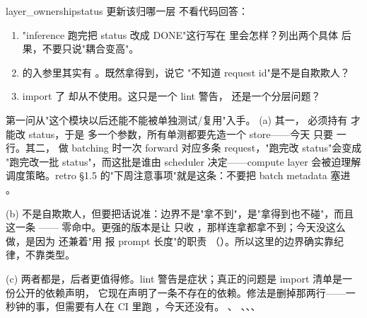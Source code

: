 \begin{checkpoint}{layer_ownership}{status 更新该归哪一层}
不看代码回答：
\begin{enumerate}[label=(\alph*)]
  \item "inference 跑完把 status 改成 DONE"这行写在  里会怎样？列出两个具体
        后果，不要只说"耦合变高"。
  \item {} 的入参里其实有 。既然拿得到，说它
        "不知道 request id"是不是自欺欺人？
  \item {} import 了  却从不使用。这只是一个 lint 警告，
        还是一个分层问题？
\end{enumerate}
\hint 第一问从"这个模块以后还能不能被单独测试/复用"入手。
\ifshowanswers
\tcblower
\answer (a) 其一， 必须持有  才能改 status，于是
 多一个参数，所有单测都要先造一个 store——今天
 只要  一行。其二，
 做 batching 时一次 forward 对应多条 request，"跑完改 status"会变成
"跑完改一批 status"，而这批是谁由 scheduler 决定——compute layer 会被迫理解调度策略。retro §1.5
的"下周注意事项"就是这条：不要把 batch metadata 塞进 。

(b) 不是自欺欺人，但要把话说准：边界不是"拿不到"，是"拿得到也不碰"，而且这一条
—— 零命中。更强的版本是让
 只收 ，那样连拿都拿不到；今天没这么做，是因为
 还兼着"用  报 prompt 长度"的职责
（）。所以这里的边界确实靠纪律，不靠类型。

(c) 两者都是，后者更值得修。lint 警告是症状；真正的问题是 import 清单是一份公开的依赖声明，
它现在声明了一条不存在的依赖。修法是删掉那两行——一秒钟的事，但需要有人在 CI 里跑
，今天还没有。
\whereincode {}、
、、、
\fi
\end{checkpoint}

